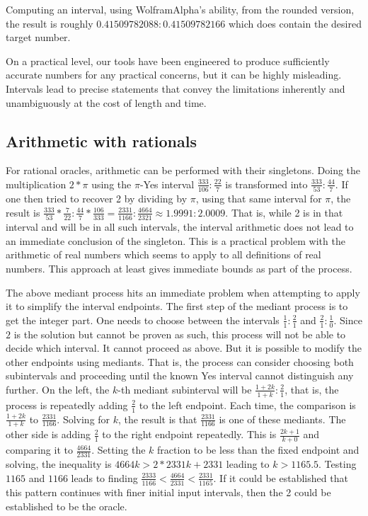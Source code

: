 \documentclass[12pt]{article}
\theoremstyle{remark}
\begin{document}
Computing an interval, using WolframAlpha's ability, from the rounded version, the result is roughly $0.41509782088:0.41509782166$ which does contain the desired target number. 

On a practical level, our tools have been engineered to produce sufficiently accurate numbers for any practical concerns, but it can be highly misleading. Intervals lead to precise statements that convey the limitations inherently and unambiguously at the cost of length and time.  

\subsection{Arithmetic with rationals}

For rational oracles, arithmetic can be performed with their singletons. Doing the multiplication $2 * \pi$ using the $\pi$-Yes interval $\frac{333}{106}: \frac{22}{7}$ is transformed into $\frac{333}{53}: \frac{44}{7}$. If one then tried to recover 2 by dividing  by $\pi$, using that same interval for $\pi$, the result is $\frac{333}{53} * \frac{7}{22}: \frac{44}{7} * \frac{106}{333} = \frac{2331}{1166}: \frac{4664}{2321} \approx 1.9991: 2.0009$. That is, while 2 is in that interval and will be in all such intervals, the interval arithmetic does not lead to an immediate conclusion of the singleton. This is a practical problem with the arithmetic of real numbers which seems to apply to all definitions of real numbers. This approach at least gives immediate bounds as part of the process.

The above mediant process hits an immediate problem when attempting to apply it to simplify the interval endpoints. The first step of the mediant process is to get the integer part. One needs to choose between the intervals $\frac{1}{1}:\frac{2}{1}$ and $\frac{2}{1}:\frac{1}{0}$. Since $2$ is the solution but cannot be proven as such, this process will not be able to decide which interval. It cannot proceed as above. But it is possible to modify the other endpoints using mediants. That is, the process can consider choosing both subintervals and proceeding until the known Yes interval cannot distinguish any further. On the left, the $k$-th mediant subinterval will be $\frac{1 + 2k}{1+k}:\frac{2}{1}$, that is, the process is repeatedly adding $\frac{2}{1}$ to the left endpoint. Each time, the comparison is $\frac{1+2k}{1+k}$ to $\frac{2331}{1166}$. Solving for $k$, the result is that $\frac{2331}{1166}$ is one of these mediants. The other side is adding $\frac{2}{1}$ to the right endpoint repeatedly. This is $\frac{2k + 1}{k+0}$ and comparing it to $\frac{4664}{2331}$. Setting the $k$ fraction to be less than the fixed endpoint and solving, the inequality is $4664k > 2*2331 k + 2331$ leading to $k > 1165.5$. Testing $1165$ and $1166$ leads to finding $\frac{2333}{1166} < \frac{4664}{2331} < \frac{2331}{1165}$. If it could be established that this pattern continues with finer initial input intervals, then the 2 could be established to be the oracle. 
\end{document}

